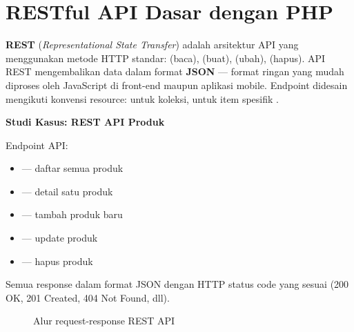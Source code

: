 ﻿\section{RESTful API Dasar dengan PHP}

\textbf{REST} (\textit{Representational State Transfer}) adalah arsitektur API yang menggunakan metode HTTP standar:  (baca),  (buat),  (ubah),  (hapus). API REST mengembalikan data dalam format \textbf{JSON} --- format ringan yang mudah diproses oleh JavaScript di front-end maupun aplikasi mobile. Endpoint didesain mengikuti konvensi resource:  untuk koleksi,  untuk item spesifik \cite{phpManual}.

\begin{contoh}
\textbf{Studi Kasus: REST API Produk}

Endpoint API:
\begin{itemize}
  \item {} --- daftar semua produk
  \item {} --- detail satu produk
  \item {} --- tambah produk baru
  \item {} --- update produk
  \item {} --- hapus produk
\end{itemize}
Semua response dalam format JSON dengan HTTP status code yang sesuai (200 OK, 201 Created, 404 Not Found, dll).
\end{contoh}

\begin{figure}[H]
\centering
{}
\caption{Alur request-response REST API}
\end{figure}

